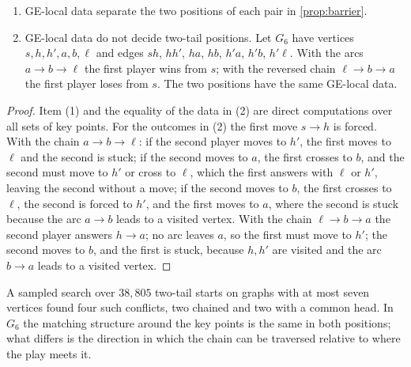 \begin{proposition}\label{prop:ge-barrier}
\begin{enumerate}[label=\textup{(\arabic*)}]
\item GE-local data separate the two positions of each pair in \cref{prop:barrier}.
\item GE-local data do not decide two-tail positions. Let $G_6$ have vertices $s,h,h',a,b,\ell$ and edges $sh$, $hh'$, $ha$, $hb$, $h'a$, $h'b$, $h'\ell$. With the arcs $a\to b\to\ell$ the first player wins from $s$; with the reversed chain $\ell\to b\to a$ the first player loses from $s$. The two positions have the same GE-local data.
\end{enumerate}
\end{proposition}
\begin{proof}
Item (1) and the equality of the data in (2) are direct computations over all sets of key points. For the outcomes in (2) the first move $s\to h$ is forced. With the chain $a\to b\to\ell$: if the second player moves to $h'$, the first moves to $\ell$ and the second is stuck; if the second moves to $a$, the first crosses to $b$, and the second must move to $h'$ or cross to $\ell$, which the first answers with $\ell$ or $h'$, leaving the second without a move; if the second moves to $b$, the first crosses to $\ell$, the second is forced to $h'$, and the first moves to $a$, where the second is stuck because the arc $a\to b$ leads to a visited vertex. With the chain $\ell\to b\to a$ the second player answers $h\to a$; no arc leaves $a$, so the first must move to $h'$; the second moves to $b$, and the first is stuck, because $h,h'$ are visited and the arc $b\to a$ leads to a visited vertex.
\end{proof}

A sampled search over $38{,}805$ two-tail starts on graphs with at most seven vertices found four such conflicts, two chained and two with a common head. In $G_6$ the matching structure around the key points is the same in both positions; what differs is the direction in which the chain can be traversed relative to where the play meets it.

